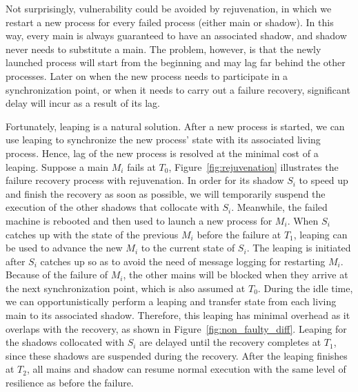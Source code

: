 Not surprisingly, vulnerability could be avoided by rejuvenation, in which we restart a new process for every failed process (either main or shadow). In this way, every main is always guaranteed to have an associated shadow, and shadow never needs to substitute a main. The problem, however, is that the newly launched process will start from the beginning and may lag far behind the other processes. Later on when the new process needs to participate in a synchronization point, or when it needs to carry out a failure recovery, significant delay will incur as a result of its lag. 

Fortunately, leaping is a natural solution. After a new process is started, we can use leaping to synchronize the new process' state with its associated living process. Hence, lag of the new process is resolved at the minimal cost of a leaping. %
Suppose a main $M_i$ fails at $T_0$, Figure~\ref{fig:rejuvenation} illustrates the failure recovery process with rejuvenation. 
In order for its shadow $S_i$ to speed up and finish the recovery as soon as possible, 
we will temporarily suspend the execution of the other shadows that collocate with $S_i$. %
Meanwhile, the failed machine is rebooted and then used to launch a new process for $M_i$. When $S_i$ catches up with the state of the previous $M_i$ before the failure at $T_1$, leaping can be used to advance the new $M_i$ to the current state of $S_i$. The leaping is initiated after $S_i$ catches up so as to avoid the need of message logging for restarting $M_i$. Because of the failure of $M_i$, the other mains will be blocked when they arrive at the next synchronization point, which is also assumed at $T_0$. During the idle time, we can opportunistically perform a leaping and transfer state from each living main to its associated shadow. Therefore, this leaping has minimal overhead as it overlaps with the recovery, as shown in Figure~\ref{fig:non_faulty_diff}. Leaping for the shadows collocated with $S_i$ are delayed until the recovery completes at $T_1$, since these shadows are suspended during the recovery. After the leaping finishes at $T_2$, all mains and shadow can resume normal execution with the same level of resilience as before the failure.

